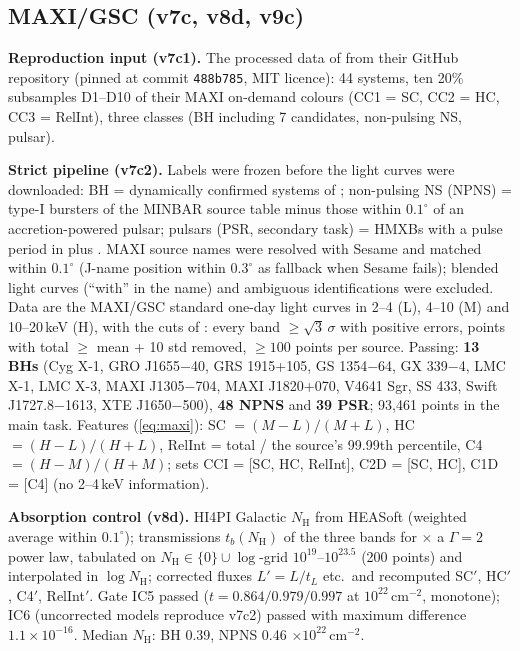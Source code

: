 \subsection{MAXI/GSC (v7c, v8d, v9c)}
\textbf{Reproduction input (v7c1).} The processed data of \citet{deBeurs2022} from their GitHub repository (pinned at commit
\texttt{488b785}, MIT licence): 44 systems, ten 20\% subsamples D1--D10 of their MAXI on-demand colours (CC1 = SC, CC2 = HC,
CC3 = RelInt), three classes (BH including 7 candidates, non-pulsing NS, pulsar).

\textbf{Strict pipeline (v7c2).} Labels were frozen before the light curves were downloaded: BH = dynamically confirmed
systems of \citet[Table 1]{Marcel2026}; non-pulsing NS (NPNS) = type-I bursters of the MINBAR source table minus those
within $0.1^\circ$ of an accretion-powered pulsar; pulsars (PSR, secondary task) = HMXBs with a pulse period in
\citet{Liu2006} plus \citet[Table 1]{PatrunoWatts2021}. MAXI source names were resolved with Sesame and matched within
$0.1^\circ$ (J-name position within $0.3^\circ$ as fallback when Sesame fails);
blended light curves (``with'' in the name) and ambiguous identifications were excluded. Data are the MAXI/GSC
standard one-day light curves in 2--4 (L), 4--10 (M) and 10--20\,keV (H), with the cuts of \citet{deBeurs2022}: every band
$\ge\sqrt3\,\sigma$ with positive errors, points with total $\ge$ mean + 10 std removed, $\ge100$ points per source. Passing:
\textbf{13 BHs} (Cyg X-1, GRO J1655$-$40, GRS 1915+105, GS 1354$-$64, GX 339$-$4, LMC X-1, LMC X-3, MAXI J1305$-$704,
MAXI J1820+070, V4641 Sgr, SS 433, Swift J1727.8$-$1613, XTE J1650$-$500), \textbf{48 NPNS} and \textbf{39 PSR}; 93,461 points in
the main task. Features (\cref{eq:maxi}): SC $=(M-L)/(M+L)$, HC $=(H-L)/(H+L)$, RelInt = total / the source's 99.99th
percentile, C4 $=(H-M)/(H+M)$; sets CCI = [SC, HC, RelInt], C2D = [SC, HC], C1D = [C4] (no 2--4\,keV information).

\textbf{Absorption control (v8d).} HI4PI \citep{HI4PI2016} Galactic $N_\mathrm{H}$ from HEASoft  (weighted average
within $0.1^\circ$); transmissions $t_b(N_\mathrm{H})$ of the three bands for  \citep{Wilms2000} $\times$ a
$\Gamma=2$ power law, tabulated on $N_\mathrm{H}\in\{0\}\cup\log$-grid $10^{19}$--$10^{23.5}$ (200 points) and interpolated in
$\log N_\mathrm{H}$; corrected fluxes $L'=L/t_L$ etc.\ and recomputed SC$'$, HC$'$, C4$'$, RelInt$'$. Gate IC5 passed
($t=0.864/0.979/0.997$ at $10^{22}$\,cm$^{-2}$, monotone); IC6 (uncorrected models reproduce v7c2) passed with maximum
difference $1.1\times10^{-16}$. Median $N_\mathrm{H}$: BH 0.39, NPNS 0.46 $\times10^{22}$\,cm$^{-2}$.

